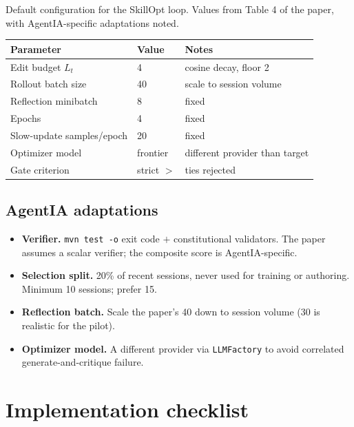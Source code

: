 \documentclass[11pt,a4paper]{article}
\begin{document}
Default configuration for the SkillOpt loop. Values from Table 4 of the
paper, with AgentIA-specific adaptations noted.

\begin{table}[h]
\centering
\begin{tabular}{@{}lll@{}}
\toprule
Parameter & Value & Notes \\
\midrule
Edit budget \(L_t\) & 4 & cosine decay, floor 2 \\
Rollout batch size & 40 & scale to session volume \\
Reflection minibatch & 8 & fixed \\
Epochs & 4 & fixed \\
Slow-update samples/epoch & 20 & fixed \\
Optimizer model & frontier & different provider than target \\
Gate criterion & strict \(>\) & ties rejected \\
\bottomrule
\end{tabular}
\end{table}

\subsection{AgentIA adaptations}

\begin{itemize}[leftmargin=1.4em]
  \item \textbf{Verifier.} \texttt{mvn test -o} exit code \(+\) constitutional
  validators. The paper assumes a scalar verifier; the composite score
  is AgentIA-specific.
  \item \textbf{Selection split.} 20\% of recent sessions, never used
  for training or authoring. Minimum 10 sessions; prefer 15.
  \item \textbf{Reflection batch.} Scale the paper's 40 down to session
  volume (30 is realistic for the pilot).
  \item \textbf{Optimizer model.} A different provider via
  \texttt{LLMFactory} to avoid correlated generate-and-critique failure.
\end{itemize}

\section{Implementation checklist}
\end{document}
